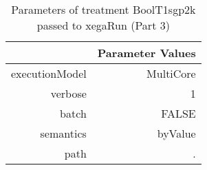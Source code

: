 \begin{table}[ht]
\centering
\begin{tabular}{rr}
  \hline
 & Parameter Values \\ 
  \hline
executionModel & MultiCore \\ 
  verbose & 1 \\ 
  batch & FALSE \\ 
  semantics & byValue \\ 
  path & . \\ 
   \hline
\end{tabular}
\caption{ Parameters of treatment BoolT1sgp2k passed to xegaRun
 (Part 3)} 
\end{table}
